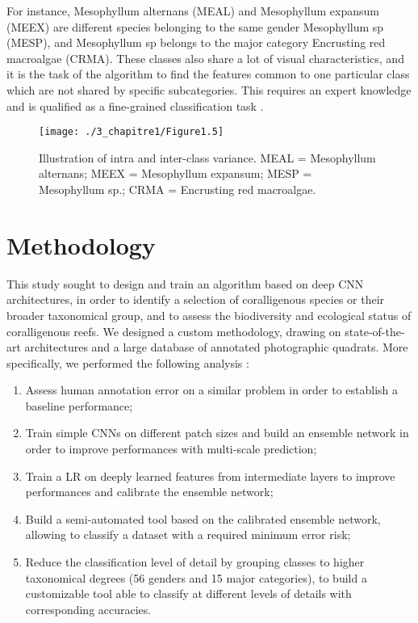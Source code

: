 For instance, Mesophyllum alternans (MEAL) and Mesophyllum expansum (MEEX) are different species belonging to the same gender Mesophyllum sp (MESP), and Mesophyllum sp belongs to the major category Encrusting red macroalgae (CRMA). These classes also share a lot of visual characteristics, and it is the task of the algorithm to find the features common to one particular class which are not shared by specific subcategories. This requires an expert knowledge and is qualified as a fine-grained classification task \citep{akata_evaluation_2015}.

\begin{figure}[H]
	\begin{center}
	\texttt{[image: ./3\_chapitre1/Figure1.5]}
		\caption[Illustration of intra and inter-class variance]{Illustration of intra and inter-class variance. MEAL = Mesophyllum alternans; MEEX = Mesophyllum expansum; MESP = Mesophyllum sp.; CRMA = Encrusting red macroalgae.}
	\label{figure1.5}
\end{center}
\end{figure}

\section{Methodology}\label{chapitre1_4}

This study sought to design and train an algorithm based on deep CNN architectures, in order to identify a selection of coralligenous species or their broader taxonomical group, and to assess the biodiversity and ecological status of coralligenous reefs. We designed a custom methodology, drawing on state-of-the-art architectures and a large database of annotated photographic quadrats. More specifically, we performed the following analysis :

\begin{enumerate}
\item Assess human annotation error on a similar problem in order to establish a baseline performance;
\item Train simple CNNs on different patch sizes and build an ensemble network in order to improve performances with multi-scale prediction;
\item Train a LR on deeply learned features from intermediate layers to improve performances and calibrate the ensemble network;
\item Build a semi-automated tool based on the calibrated ensemble network, allowing to classify a dataset with a required minimum error risk;
\item Reduce the classification level of detail by grouping classes to higher taxonomical degrees (56 genders and 15 major categories), to build a customizable tool able to classify at different levels of details with corresponding accuracies.
\end{enumerate}

